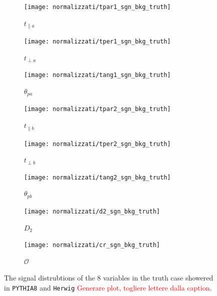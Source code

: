 \documentclass[10pt,a4paper]{book}
\newcommand\todo[1]{\textcolor{red}{#1}}
\def\code#1{\texttt{#1}}
\begin{document}
\begin{figure}
\begin{subfigure}{.33\textwidth}
\centering
\texttt{[image: normalizzati/tpar1\_sgn\_bkg\_truth]}
\caption{$t_{\parallel a}$}
\end{subfigure}
\begin{subfigure}{0.33\textwidth}
\centering
\texttt{[image: normalizzati/tper1\_sgn\_bkg\_truth]}
\caption{$t_{\perp a}$}
\end{subfigure}
\begin{subfigure}{.33\textwidth}
\centering
\texttt{[image: normalizzati/tang1\_sgn\_bkg\_truth]}
\caption{$\theta_{pa}$}
\end{subfigure}
\begin{subfigure}{.33\textwidth}
\centering
\texttt{[image: normalizzati/tpar2\_sgn\_bkg\_truth]}
\caption{$t_{\parallel b}$}
\end{subfigure}
\begin{subfigure}{0.33\textwidth}
\centering
\texttt{[image: normalizzati/tper2\_sgn\_bkg\_truth]}
\caption{$t_{\perp b}$}
\end{subfigure}
\begin{subfigure}{.33\textwidth}
\centering
\texttt{[image: normalizzati/tang2\_sgn\_bkg\_truth]}
\caption{$\theta_{pb}$}
\end{subfigure}
\begin{subfigure}{0.5\textwidth}
\centering
\texttt{[image: normalizzati/d2\_sgn\_bkg\_truth]}
\caption{$D_2$}
\end{subfigure}
\begin{subfigure}{.5\textwidth}
\centering
\texttt{[image: normalizzati/cr\_sgn\_bkg\_truth]}
\caption{$\mathcal{O}$}
\end{subfigure}
\caption{The signal distrubtions of the 8 variables in the truth case showered in \code{PYTHIA8} and \code{Herwig} \todo{Generare plot, togliere lettere dalla caption}.}
\label{pythia herwig sgn}
\end{figure}
\end{document}

